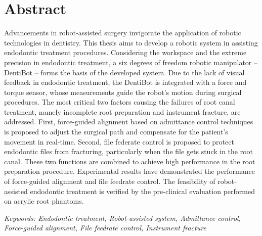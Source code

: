 \chapter{Abstract}
\label{ch:abstract}
\vspace{3mm}
\hspace*{6mm}Advancements in robot-assisted surgery invigorate the application of robotic technologies in dentistry. This thesis aims to develop a robotic system in assisting endodontic treatment procedures. Considering the workspace and the extreme precision in endodontic treatment, a six degrees of freedom robotic manipulator -- DentiBot -- forms the basis of the developed system. Due to the lack of visual feedback in endodontic treatment, the DentiBot is integrated with a force and torque sensor, whose measurements guide the robot's motion during surgical procedures. The most critical two factors causing the failures of root canal treatment, namely incomplete root preparation and instrument fracture, are addressed. First, force-guided alignment based on admittance control techniques is proposed to adjust the surgical path and compensate for the patient's movement in real-time. Second, file federate control is proposed to protect endodontic files from fracturing, particularly when the file gets stuck in the root canal. These two functions are combined to achieve high performance in the root preparation procedure. Experimental results have demonstrated the performance of force-guided alignment and file feedrate control. The feasibility of robot-assisted endodontic treatment is verified by the pre-clinical evaluation performed on acrylic root phantoms.
\vspace{10mm}
\par\noindent
\textit{Keywords: Endodontic treatment, Robot-assisted system, Admittance control, Force-guided alignment, File feedrate control, Instrument fracture}




